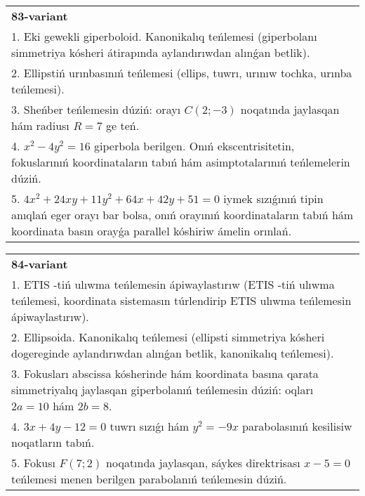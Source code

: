 \documentclass{article}
\begin{document}
\begin{tabular}{m{17cm}}
\textbf{83-variant}\\
1. Eki gewekli giperboloid. Kanonikalıq teńlemesi (giperbolanı simmetriya kósheri átirapında aylandırıwdan alınǵan betlik).\\

2. Ellipstiń urınbasınıń teńlemesi (ellips, tuwrı, urınıw tochka, urınba teńlemesi).\\

3. Sheńber teńlemesin dúziń: orayı $C (2;-3) $ noqatında jaylasqan hám radiusı $R=7$ ge teń.\\

4. $x^{2} - 4y^{2} = 16$ giperbola berilgen. Onıń ekscentrisitetin, fokuslarınıń koordinataların tabıń hám asimptotalarınıń teńlemelerin dúziń.\\

5. $4x^{2} + 24xy + 11y^{2} + 64x + 42y + 51 = 0$ iymek sızıǵınıń tipin anıqlań eger orayı bar bolsa, onıń orayınıń koordinataların tabıń hám koordinata basın orayǵa parallel kóshiriw ámelin orınlań.  
\end{tabular}
\vspace{1cm}


\begin{tabular}{m{17cm}}
\textbf{84-variant}\\
1. ETIS -tiń ulıwma teńlemesin ápiwaylastırıw (ETIS -tiń ulıwma teńlemesi, koordinata sistemasın túrlendirip ETIS ulıwma teńlemesin ápiwaylastırıw).\\

2. Ellipsoida. Kanonikalıq teńlemesi (ellipsti simmetriya kósheri dogereginde aylandırıwdan alınǵan betlik, kanonikalıq teńlemesi).\\

3. Fokusları abscissa kósherinde hám koordinata basına qarata simmetriyalıq jaylasqan giperbolanıń teńlemesin dúziń: oqları $2 a=10$ hám $2 b=8$.\\

4. $3x + 4y - 12 = 0$ tuwrı sızıǵı hám $y^{2} = - 9x$ parabolasınıń kesilisiw noqatların tabıń.  \\

5. Fokusı $F(7;2)$ noqatında jaylasqan, sáykes direktrisası $x - 5 = 0$ teńlemesi menen berilgen parabolanıń teńlemesin dúziń.  
\end{tabular}
\vspace{1cm}
\end{document}
